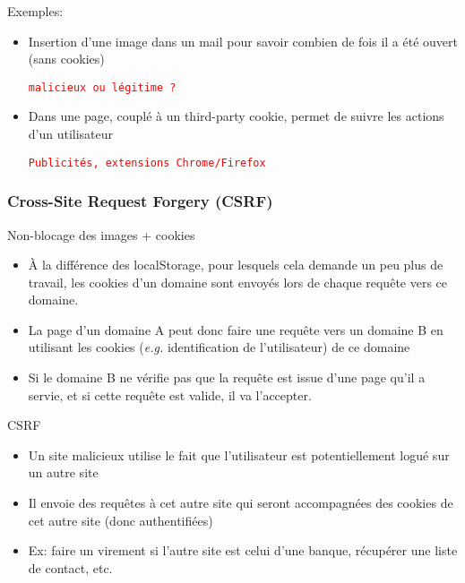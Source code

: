 \begin{reveals}
\begin{frame}
  \pause{}
  \begin{block}{Exemples:}
    \begin{itemize}
    \item Insertion d'une image dans un mail pour savoir combien de
      fois il a \'et\'e ouvert (sans cookies)
      \begin{center}
        \texttt{\textcolor{red}{malicieux ou l\'egitime ?}}
      \end{center}
    \item Dans une page, coupl\'e \`a un third-party cookie, permet de
      suivre les actions d'un utilisateur 
      \begin{center}
        \texttt{\textcolor{red}{Publicit\'es, extensions Chrome/Firefox}}
      \end{center}
    \end{itemize}
  \end{block}

\end{frame}



\begin{frame}
  \frametitle{Cross-Site Request Forgery (CSRF)}

  \begin{block}{Non-blocage des images + cookies}
    \begin{itemize}
    \item {\`A} la diff{\'e}rence des localStorage, pour lesquels cela demande
      un peu plus de travail, les cookies d'un domaine sont envoy{\'e}s
      lors de chaque requ{\^e}te vers ce domaine.
    \item La page d'un domaine A peut donc faire une requ{\^e}te vers un
      domaine B en utilisant les cookies (\textit{e.g.} identification
      de l'utilisateur) de ce domaine
    \item Si le domaine B ne v{\'e}rifie pas que la requ{\^e}te est issue
      d'une page qu'il a servie, et si cette requ{\^e}te est valide, il
      va l'accepter.
    \end{itemize}
  \end{block}

  \pause

  \begin{block}{CSRF}
    \begin{itemize}
    \item Un site malicieux utilise le fait que l'utilisateur est
      potentiellement logu{\'e} sur un autre site
    \item Il envoie des requ{\^e}tes {\`a} cet autre site qui seront
      accompagn{\'e}es des cookies de cet autre site (donc authentifi{\'e}es)
    \item Ex: faire un virement si l'autre site est celui d'une
      banque, r{\'e}cup{\'e}rer une liste de contact, etc.
    \end{itemize}
  \end{block}


\end{frame}
\end{reveals}
